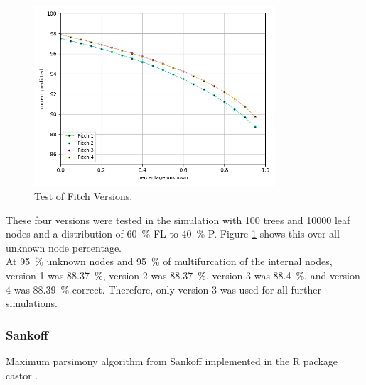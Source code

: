       \begin{figure}
        \centering
        \includegraphics[width=0.8\textwidth]{Figures/simulation_fitch_evaluation.png}
        \caption{Test of Fitch Versions.}
        \label{fig:Fitch versions}
      \end{figure}
      These four versions were tested in the simulation with 100 trees and 10000 leaf nodes and a
        distribution of 60~\% FL to 40~\% P. Figure \ref{fig:Fitch versions} shows this over all unknown 
        node percentage. \\
      At 95~\% unknown nodes and 95~\% of multifurcation of the internal nodes, version 1 was 88.37~\%, 
        version 2 was 88.37~\%, version 3 was 88.4~\%, and version 4 was 88.39~\% correct. Therefore, 
        only version 3 was used for all further simulations.
        


    \subsubsection{Sankoff}
      Maximum parsimony algorithm from Sankoff implemented in the R package castor \cite{Louca2017}. \\


